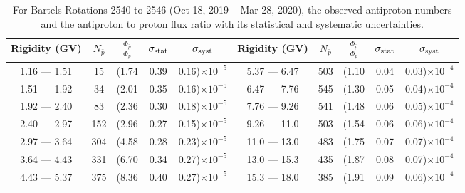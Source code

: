 \begin{table}[p] 
\renewcommand\baselinestretch{1.3}\selectfont
\setlength\tabcolsep{3pt}
\centering
\begin{tabular}{ccccc | ccccc}
\hline
\textbf{Rigidity}  (GV)  & $N_{\bar{p}}$ & $\frac{\Phi_{\bar{p}}}{\Phi_{p}}$ & $\sigma_{\rm{stat}}$ & $\sigma_{\rm{syst}}$ \hspace{1cm}   & \textbf{Rigidity}  (GV)  & $N_{\bar{p}}$ & $\frac{\Phi_{\bar{p}}}{\Phi_{p}}$ & $\sigma_{\rm{stat}}$ & $\sigma_{\rm{syst}}$ \hspace{1cm} \\ 
\hline
1.16 — 1.51   &  15                  &(1.74                          &  0.39              &      0.16)$\times 10^{-5}$  & 5.37 — 6.47                &  503                    &(1.10                                &  0.04                   &      0.03)$\times 10^{-4}$\\
1.51 — 1.92   &  34                  &(2.01                          &  0.35              &      0.16)$\times 10^{-5}$  & 6.47 — 7.76                &  545                    &(1.30                                &  0.05                   &      0.04)$\times 10^{-4}$\\
1.92 — 2.40   &  83                  &(2.36                          &  0.30              &      0.18)$\times 10^{-5}$  & 7.76 — 9.26                &  541                    &(1.48                                &  0.06                   &      0.05)$\times 10^{-4}$\\    
2.40 — 2.97   &  152                &(2.96                          &  0.27              &      0.15)$\times 10^{-5}$  & 9.26 — 11.0                &  503                    &(1.54                                &  0.06                   &      0.06)$\times 10^{-4}$\\    
2.97 — 3.64   &  304                &(4.58                          &  0.28              &      0.23)$\times 10^{-5}$  & 11.0 — 13.0                 &  483                    &(1.75                                &  0.07                   &      0.07)$\times 10^{-4}$\\
3.64 — 4.43   &  331                &(6.70                          &  0.34              &      0.27)$\times 10^{-5}$  & 13.0 — 15.3               &  435                    &(1.87                                &  0.08                   &      0.07)$\times 10^{-4}$\\
4.43 — 5.37   &  375                &(8.36                          &  0.40              &      0.27)$\times 10^{-5}$  & 15.3 — 18.0               &  385                    &(1.91                                &  0.09                   &      0.06)$\times 10^{-4}$\\
\hline
\end{tabular}
\caption[Antiproton to proton flux ratio for Bartels Rotations 2540 to 2546]{For Bartels Rotations 2540 to 2546 (Oct 18, 2019 – Mar 28, 2020), the observed antiproton numbers and the antiproton to proton flux ratio with its statistical and systematic uncertainties.}
\label{TableOfDependent20}
\end{table}

